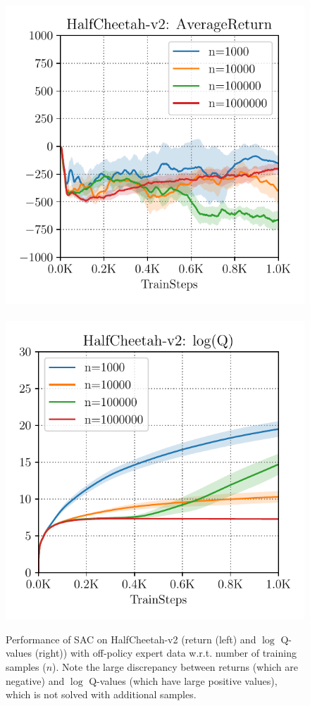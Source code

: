 \begin{figure}
\vspace{-10pt}
\begin{center}
\vspace{-0.1in}
    \includegraphics[width=0.45\linewidth]{chapters/bear/images/cheetah_divergence.pdf}
    ~
    \includegraphics[width=0.45\linewidth]{chapters/bear/images/cheetah_divergence_q_val.pdf}
  \end{center}
 \vspace{-10pt}
  \caption{ \footnotesize Performance of SAC on HalfCheetah-v2 (return (left) and $\log$ Q-values (right)) with off-policy expert data w.r.t. number of training samples ($n$). Note the large discrepancy between returns (which are negative) and $\log$ Q-values (which have large positive values), which is not solved with additional samples.} 
 \vspace{-15pt}
 \label{fig:divergence}
\end{figure}
